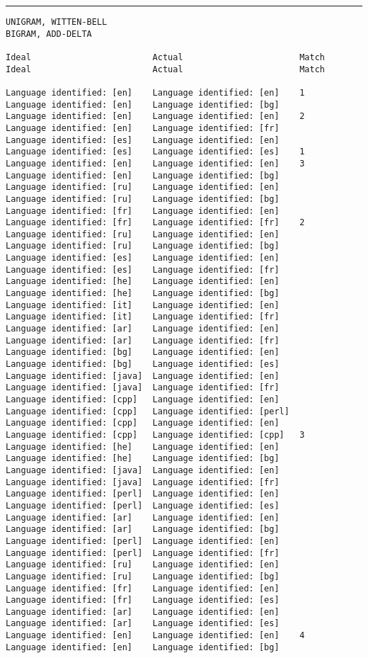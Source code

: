 \tiny
\hrule\vskip4pt
\begin{verbatim}
UNIGRAM, WITTEN-BELL                                               BIGRAM, ADD-DELTA

Ideal                        Actual                       Match    Ideal                        Actual                       Match

Language identified: [en]    Language identified: [en]    1        Language identified: [en]    Language identified: [bg]
Language identified: [en]    Language identified: [en]    2        Language identified: [en]    Language identified: [fr]
Language identified: [es]    Language identified: [en]             Language identified: [es]    Language identified: [es]    1
Language identified: [en]    Language identified: [en]    3        Language identified: [en]    Language identified: [bg]
Language identified: [ru]    Language identified: [en]             Language identified: [ru]    Language identified: [bg]
Language identified: [fr]    Language identified: [en]             Language identified: [fr]    Language identified: [fr]    2
Language identified: [ru]    Language identified: [en]             Language identified: [ru]    Language identified: [bg]
Language identified: [es]    Language identified: [en]             Language identified: [es]    Language identified: [fr]
Language identified: [he]    Language identified: [en]             Language identified: [he]    Language identified: [bg]
Language identified: [it]    Language identified: [en]             Language identified: [it]    Language identified: [fr]
Language identified: [ar]    Language identified: [en]             Language identified: [ar]    Language identified: [fr]
Language identified: [bg]    Language identified: [en]             Language identified: [bg]    Language identified: [es]
Language identified: [java]  Language identified: [en]             Language identified: [java]  Language identified: [fr]
Language identified: [cpp]   Language identified: [en]             Language identified: [cpp]   Language identified: [perl]
Language identified: [cpp]   Language identified: [en]             Language identified: [cpp]   Language identified: [cpp]   3
Language identified: [he]    Language identified: [en]             Language identified: [he]    Language identified: [bg]
Language identified: [java]  Language identified: [en]             Language identified: [java]  Language identified: [fr]
Language identified: [perl]  Language identified: [en]             Language identified: [perl]  Language identified: [es]
Language identified: [ar]    Language identified: [en]             Language identified: [ar]    Language identified: [bg]
Language identified: [perl]  Language identified: [en]             Language identified: [perl]  Language identified: [fr]
Language identified: [ru]    Language identified: [en]             Language identified: [ru]    Language identified: [bg]
Language identified: [fr]    Language identified: [en]             Language identified: [fr]    Language identified: [es]
Language identified: [ar]    Language identified: [en]             Language identified: [ar]    Language identified: [es]
Language identified: [en]    Language identified: [en]    4        Language identified: [en]    Language identified: [bg]


\end{verbatim}
